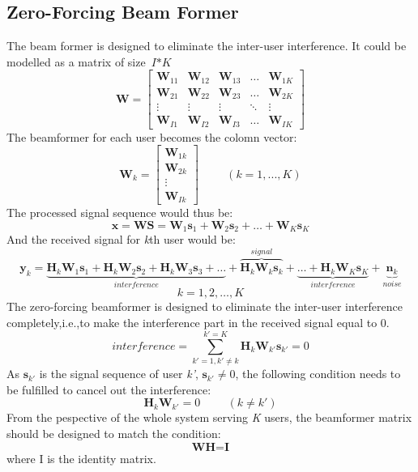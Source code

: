 \documentclass{article}
\begin{document}
\subsection{Zero-Forcing Beam Former}
The beam former is designed to eliminate the inter-user interference. It could be modelled as a matrix of size $\textit{I}*\textit{K}$
\[
\textbf{W}
=
\begin{bmatrix}
    \textbf{W}_{11} & \textbf{W}_{12} & \textbf{W}_{13} & \dots  & \textbf{W}_{1K} \\
    \textbf{W}_{21} & \textbf{W}_{22} & \textbf{W}_{23} & \dots  & \textbf{W}_{2K} \\
    \vdots & \vdots & \vdots & \ddots & \vdots \\
    \textbf{W}_{I1} & \textbf{W}_{I2} & \textbf{W}_{I3} & \dots  & \textbf{W}_{IK}
\end{bmatrix}
\]
The beamformer for each user becomes the colomn vector:
\[
\textbf{W}_k
=
\begin{bmatrix}
    \textbf{W}_{1k} \\
    \textbf{W}_{2k} \\
    \vdots \\
    \textbf{W}_{Ik}
\end{bmatrix} \hspace{1cm}(k = 1,...,K)
\]
The processed signal sequence would thus be:
\[
\textbf{x} = \textbf{WS} = \textbf{W}_1\textbf{s}_1 + \textbf{W}_2\textbf{s}_2 + \dots +\textbf{W}_K\textbf{s}_K
\]
And the received signal for \textit{k}th user would be:
\[
\textbf{y}_k = \underbrace{\textbf{H}_k\textbf{W}_1\textbf{s}_1 +\textbf{H}_k\textbf{W}_2\textbf{s}_2+\textbf{H}_k\textbf{W}_3\textbf{s}_3
+\dots}_{interference}+\overbrace{\textbf{H}_k\textbf{W}_k\textbf{s}_k}^{signal}+
\underbrace{\dots+\textbf{H}_k\textbf{W}_K\textbf{s}_K}_{interference} +\underbrace{\textbf{n}_k}_{noise}
\]
\[
\textit{k} = 1,2,\dots,\textit{K}
\]
The zero-forcing beamformer is designed to eliminate the inter-user interference completely,i.e.,to make the interference part in the received signal equal to 0.
\[
\textit{interference} = \sum_{k' = 1,k'\neq k}^{k' = K}\textbf{H}_k\textbf{W}_{k'}\textbf{s}_{k'} = 0
\]
As $\textbf{s}_{k'}$ is the signal sequence of user \textit{k'}, $\textbf{s}_{k'} \neq 0$, the following condition needs to be fulfilled to cancel out the interference:
\[
\textbf{H}_k\textbf{W}_{k'} = 0 \hspace{1cm}(k \neq k')
\]
From the pespective of the whole system serving \textit{K} users, the beamformer matrix should be designed to match the condition:
\[
\textbf{WH} = \textbf{I}
\]
where I is the identity matrix.
\end{document}
